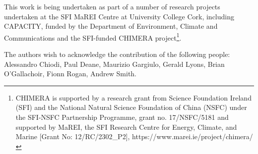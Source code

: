 \documentclass[gmd,manuscript]{copernicus}
\begin{document}
\begin{acknowledgements}
This work is being undertaken as part of a number of research projects undertaken at the SFI MaREI Centre at University College Cork, including CAPACITY, funded by the Department of Environment, Climate and Communications and the SFI-funded CHIMERA project\footnote{CHIMERA is supported by a research grant from Science Foundation Ireland (SFI) and the National Natural Science Foundation of China (NSFC) under the SFI-NSFC Partnership Programme, grant no. 17/NSFC/5181 and supported by MaREI, the SFI Research Centre for Energy, Climate, and Marine [Grant No: 12/RC/2302\_P2], https://www.marei.ie/project/chimera/}.

The authors wish to acknowledge the contribution of the following people: Alessandro Chiodi, Paul Deane, Maurizio Gargiulo, Gerald Lyons, Brian O'Gallachoir, Fionn Rogan, Andrew Smith.
\end{acknowledgements}















\end{document}
